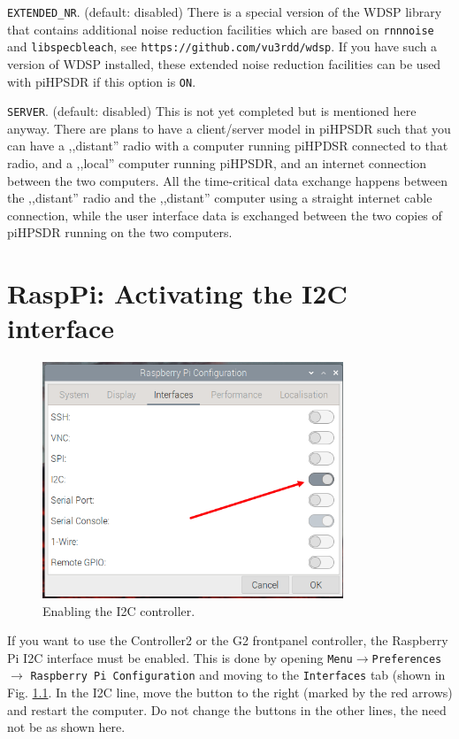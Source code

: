 \documentclass[12pt]{book}
\def\rett#1{\texttt{\color{red}#1}}
\begin{document}
\rett{EXTENDED\_NR}. (default: disabled)
There is a special version of the WDSP library that contains additional noise
reduction facilities which are based on  \texttt{rnnnoise} and \texttt{libspecbleach}, see
 \texttt{https://github.com/vu3rdd/wdsp}. If you have such a version of WDSP installed, these 
 extended noise reduction facilities can be used with piHPSDR if this option is \texttt{ON}.
 
 \rett{SERVER}. (default: disabled)
 This is not yet completed but is mentioned here anyway. There are plans to have
 a client/server model in piHPSDR such that you can have a ,,distant'' radio with a computer
 running piHPDSR connected to that radio, and a ,,local'' computer running piHPSDR, and an
 internet connection between the two computers. All the time-critical data exchange happens
 between the ,,distant'' radio and the ,,distant'' computer using a straight internet
 cable connection, while the user interface data is exchanged between the two copies of
 piHPSDR running on the two computers.


\chapter[RaspPi: Activating I2C]{RaspPi: Activating the I2C interface}
\label{sec:i2c}

\begin{figure}[ht]
\center
\includegraphics[width=9cm]{piEnableI2C.png}
\caption{Enabling the I2C controller.}
\label{fig:piEnableI2C}
\end{figure}

If you want to use the Controller2 or the G2 frontpanel controller, the Raspberry Pi I2C interface
must be enabled. This is done by opening \texttt{Menu}$\to$\texttt{Preferences}$\to$
\texttt{Raspberry Pi Configuration} and moving to the \texttt{Interfaces} tab
(shown in Fig. \ref{fig:piEnableI2C}. In the I2C line, move the button to the right
(marked by the red arrows) and restart the computer. 
Do not change the buttons in the other lines, the need not be as shown here.
\end{document}
